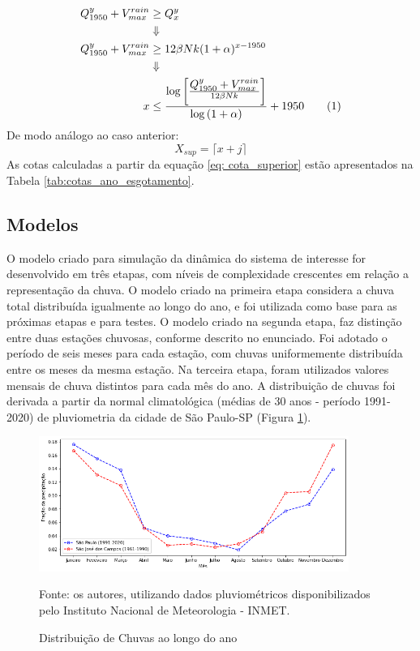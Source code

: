 \documentclass{article}
\newcommand\numberthis{\addtocounter{equation}{1}\tag{\theequation}}
\begin{document}
\begin{align*}
    Q_{1950}^y + V_{max}^{rain} &\geq Q_x^y \\
                                &\Downarrow \\
    Q_{1950}^y + V_{max}^{rain} &\geq 12\beta N k(1 + \alpha)^{x - 1950} \\
                                &\Downarrow \\
    x                           &\leq \frac{\log{\left[ \frac{\displaystyle Q_{1950}^y + V_{max}^{rain}}{12\beta Nk}\right]}}{\displaystyle \log{(1 + \alpha)}} + 1950 \numberthis \label{eq: anos_cota_superior}
\end{align*}
De modo análogo ao caso anterior:
\begin{equation}
\label{eq: cota_superior}
    X_{sup} = \lceil x + j  \rceil
\end{equation}
As cotas calculadas a partir da equação \ref{eq: cota_superior} estão apresentados na Tabela \ref{tab:cotas_ano_esgotamento}.

\subsection*{Modelos}

O modelo criado para simulação da dinâmica do sistema de interesse for desenvolvido em três etapas, com níveis de complexidade crescentes em relação a representação da chuva. O modelo criado na primeira etapa considera a chuva total distribuída igualmente ao longo do ano, e foi utilizada como base para as próximas etapas e para testes. O modelo criado na segunda etapa, faz distinção entre duas estações chuvosas, conforme descrito no enunciado. Foi adotado o período de seis meses para cada estação, com chuvas uniformemente distribuída entre os meses da mesma estação. Na terceira etapa, foram utilizados valores mensais de chuva distintos para cada mês do ano. A distribuição de chuvas foi derivada a partir da normal climatológica (médias de 30 anos - período 1991-2020) de pluviometria da cidade de São Paulo-SP (Figura \ref{fig:distribuicao_chuva}).

\begin{figure}
    \centering
    \caption{Distribuição de Chuvas ao longo do ano}
    \label{fig:distribuicao_chuva}
    \includegraphics[width=0.9\textwidth]{imagens/pluviometria.png}
    {\flushleft Fonte: os autores, utilizando dados pluviométricos disponibilizados pelo Instituto Nacional de Meteorologia - INMET. \par}
\end{figure}
\end{document}
